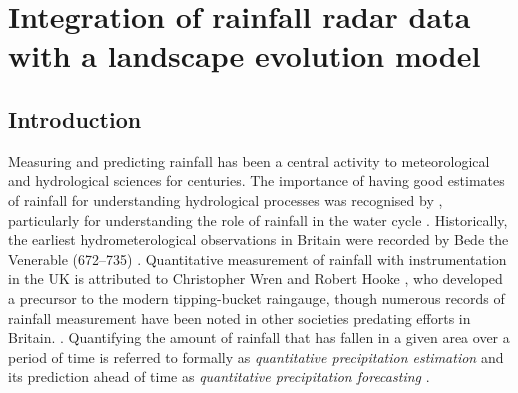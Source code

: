 \chapter{Integration of rainfall radar data with a landscape evolution model}
\label{chapter_metdata}

% 
%

\section{Introduction}

Measuring and predicting rainfall has been a central activity to meteorological and hydrological sciences for centuries. The importance of having good estimates of rainfall for understanding hydrological processes was recognised by \citet{perrault1674}, particularly for understanding the role of rainfall in the water cycle \citep{biswas1970history}. Historically, the earliest hydrometerological observations in Britain were recorded by Bede the Venerable (672--735) \citep{mcculloch1993history}. Quantitative measurement of rainfall with instrumentation in the UK is attributed to Christopher Wren and Robert Hooke \citep{biswas1970history}, who developed a precursor to the modern tipping-bucket raingauge, though numerous records of rainfall measurement have been noted in other societies predating efforts in Britain. \citep{strangeways2010history}. Quantifying the amount of rainfall that has fallen in a given area over a period of time is referred to formally as \textit{quantitative precipitation estimation} \citep{fabry2015radar} and its prediction ahead of time as \textit{quantitative precipitation forecasting} \citep{golding2000quantitative,browning2003quantitative}.

